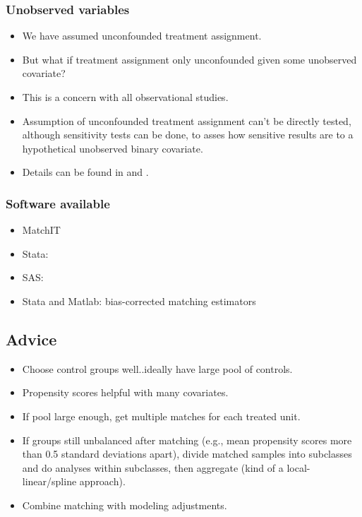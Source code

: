 \documentclass[11pt,titlepage]{article}
\begin{document}
\subsubsection{Unobserved variables}
\begin{itemize}
\item We have assumed unconfounded treatment assignment.
\item But what if treatment assignment only unconfounded given some
  unobserved covariate?
\item This is a concern with all observational studies.
\item Assumption of unconfounded treatment assignment can't be
  directly tested, although sensitivity tests can be done, to asses
  how sensitive results are to a hypothetical unobserved binary
  covariate.
\item Details can be found in \cite{RosRub83b} and \cite{Imbens03}.
\end{itemize}

\subsubsection{Software available}
\begin{itemize} 
\item MatchIT
\item Stata: \cite{AbaDruHerImb02, BecIch02, LeuSia03}
\item SAS: \cite{Dagostino98}
\item Stata and Matlab: \cite{AbaImb04} bias-corrected matching
  estimators
\end{itemize} 

\subsection{Advice}
\begin{itemize}
\item Choose control groups well..ideally have large pool of controls.
\item Propensity scores helpful with many covariates.
\item If pool large enough, get multiple matches for each treated
  unit.
\item If groups still unbalanced after matching (e.g., mean propensity
  scores more than 0.5 standard deviations apart), divide matched
  samples into subclasses and do analyses within subclasses, then
  aggregate (kind of a local-linear/spline approach).
\item Combine matching with modeling adjustments.
\end{itemize} 
\end{document}
